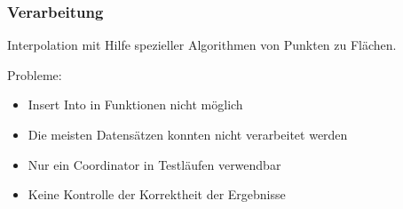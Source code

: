 \documentclass{beamer}
\begin{document}
\begin{frame}\frametitle{Verarbeitung}
Interpolation mit Hilfe spezieller Algorithmen von Punkten zu Flächen.

\begin{block}{Probleme:}
\begin{itemize}
\item Insert Into in Funktionen nicht möglich
\item Die meisten Datensätzen konnten nicht verarbeitet werden
\item Nur ein Coordinator in Testläufen verwendbar
\item Keine Kontrolle der Korrektheit der Ergebnisse
\end{itemize}
\end{block}
\end{frame} 
\end{document}
